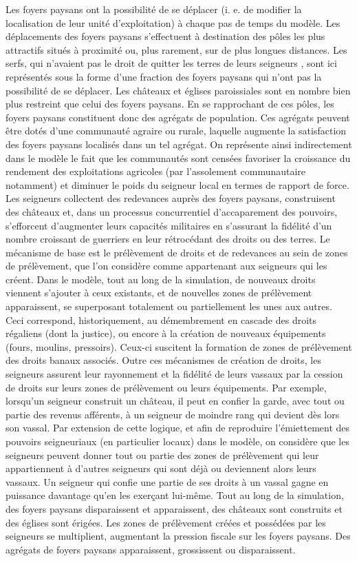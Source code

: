 Les foyers paysans ont la possibilité de se déplacer (i. e. de modifier la
localisation de leur unité d'exploitation) à chaque pas de temps du modèle.
Les déplacements des foyers paysans s'effectuent à destination des pôles les plus attractifs situés à proximité ou, plus rarement, sur de plus longues distances.
Les serfs, qui n'avaient pas le droit de quitter les terres de leurs seigneurs \autocite{feller_paysans_2007}, sont ici représentés sous la forme d'une fraction des foyers paysans qui n'ont pas la possibilité de se déplacer.
Les châteaux et églises paroissiales sont en nombre bien plus restreint	que celui des foyers paysans.
En se rapprochant de ces pôles, les foyers paysans constituent donc des agrégats de population.
Ces agrégats peuvent être dotés d'une communauté agraire ou rurale, laquelle augmente la satisfaction des foyers paysans localisés dans un tel agrégat.
On représente ainsi indirectement dans le modèle le fait que les communautés sont censées favoriser la croissance du rendement des exploitations agricoles (par l'assolement communautaire notamment) et diminuer le poids du seigneur local en termes de rapport de force.
Les seigneurs collectent des redevances auprès des foyers paysans, construisent des châteaux et, dans un processus concurrentiel d'accaparement des pouvoirs, s'efforcent d'augmenter leurs capacités militaires en s'assurant la fidélité d'un nombre croissant de guerriers en leur rétrocédant des droits ou des terres.
Le mécanisme de base est le prélèvement de droits et de redevances au sein de zones de prélèvement, que l'on considère comme appartenant aux seigneurs qui les créent.
Dans le modèle, tout au long de la simulation, de nouveaux droits viennent s'ajouter à ceux existants, et de nouvelles zones de prélèvement apparaissent, se superposant totalement ou partiellement les unes aux
autres.
Ceci correspond, historiquement, au démembrement en cascade des droits régaliens (dont la justice), ou encore à la création de nouveaux équipements (fours, moulins, pressoirs).
Ceux-ci suscitent la formation de zones de prélèvement des droits banaux associés.
Outre ces mécanismes de création de droits, les seigneurs assurent leur rayonnement et la fidélité de leurs vassaux par la cession de droits sur leurs zones de prélèvement ou leurs équipements.
Par exemple, lorsqu'un seigneur construit un château, il peut en confier la garde, avec tout ou partie des revenus afférents, à un seigneur de moindre rang qui devient dès lors son vassal.
Par extension de cette logique, et afin de reproduire l'émiettement des pouvoirs seigneuriaux (en particulier locaux) dans le modèle, on considère que les seigneurs peuvent donner tout ou partie des zones de prélèvement qui leur appartiennent à d'autres seigneurs qui sont déjà ou deviennent alors leurs vassaux.
Un seigneur qui confie une partie de ses droits à un vassal gagne en puissance davantage qu'en les exerçant lui-même.
Tout au long de la simulation, des foyers paysans disparaissent et apparaissent, des châteaux sont construits et des églises sont érigées.
Les zones de prélèvement créées et possédées par les seigneurs se multiplient, augmentant la pression fiscale sur les foyers paysans.
Des agrégats de foyers paysans apparaissent, grossissent ou disparaissent.

